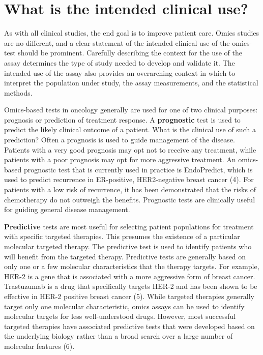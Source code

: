 \documentclass[11pt]{article}
\begin{document}
\section{What is the intended clinical
use?}\label{what-is-the-intended-clinical-use}

As with all clinical studies, the end goal is to improve patient care.
Omics studies are no different, and a clear statement of the intended
clinical use of the omics-test should be prominent. Carefully describing
the context for the use of the assay determines the type of study needed
to develop and validate it. The intended use of the assay also provides
an overarching context in which to interpret the population under study,
the assay measurements, and the statistical methods.

Omics-based tests in oncology generally are used for one of two clinical
purposes: prognosis or prediction of treatment response. A
\textbf{prognostic} test is used to predict the likely clinical outcome
of a patient. What is the clinical use of such a prediction? Often a
prognosis is used to guide management of the disease. Patients with a
very good prognosis may opt not to receive any treatment, while patients
with a poor prognosis may opt for more aggressive treatment. An
omics-based prognostic test that is currently used in practice is
EndoPredict, which is used to predict recurrence in ER-positive,
HER2-negative breast cancer (4). For patients with a low risk of
recurrence, it has been demonstrated that the risks of chemotherapy do
not outweigh the benefits. Prognostic tests are clinically useful for
guiding general disease management.

\textbf{Predictive} tests are most useful for selecting patient
populations for treatment with specific targeted therapies. This
presumes the existence of a particular molecular targeted therapy. The
predictive test is used to identify patients who will benefit from the
targeted therapy. Predictive tests are generally based on only one or a
few molecular characteristics that the therapy targets. For example,
HER-2 is a gene that is associated with a more aggressive form of breast
cancer. Trastuzumab is a drug that specifically targets HER-2 and has
been shown to be effective in HER-2 positive breast cancer (5). While
targeted therapies generally target only one molecular characteristic,
omics assays can be used to identify molecular targets for less
well-understood drugs. However, most successful targeted therapies have
associated predictive tests that were developed based on the underlying
biology rather than a broad search over a large number of molecular
features (6).
\end{document}
